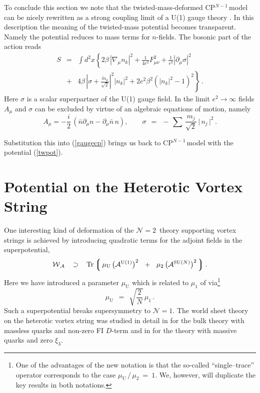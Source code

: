 \documentclass[12pt]{article}
\def\beq{\begin{equation}}
\def\eeq{\end{equation}}
\def\beqn{\begin{eqnarray}}
\def\eeqn{\end{eqnarray}}
\def\beqn{\begin{eqnarray}}
\def\eeqn{\end{eqnarray}}
\newcommand{\ntwon}{${\mathcal N}=2$}
\newcommand{\nonen}{${\mathcal N}=1$}
\newcommand{\pt}{\partial}
\newcommand{\mc}[1]{\mathcal{#1}}
\newcommand{\mw}{\mathcal{W}}
\newcommand{\ma}{\mathcal{A}}
\newcommand{\lgr}{\left\lgroup}
\newcommand{\rgr}{\right\rgroup}
\newcommand{\AU}{\mc{A}^{\rm U(1)}}
\newcommand{\AN}{\mc{A}^\text{SU($N$)}}
\newcommand{\muU}{\mu_\text{U}}
\newcommand{\cpn}{CP$^{N-1}$\,}
\newcommand{\Tr}{\text{Tr}}
\begin{document}
To conclude this section we note that the twisted-mass-deformed \cpn model can be nicely rewritten as a
strong coupling limit of a U(1) gauge theory \cite{HaHo}. 
In this description the meaning of the twisted-mass potential becomes  transparent. Namely the potential  reduces to mass terms for $n$-fields.  The bosonic part of the action reads
\beqn
S 
&=&
\int d^2 x \left\{
 2\beta\,|\nabla_{\mu} n_{k}|^2 +\frac1{4e^2}F^2_{\mu\nu} + \frac1{e^2}|\pt_{\mu}\sigma|^2
\right.
\nonumber\\[3mm]
 &+& \left. 4\beta\,|\sigma+\frac{\tilde{m}_{k}}{\sqrt{2}}|^2 |n_{k}|^2 +
 2e^2 \beta^2(|n_{k}|^2 -1)^2
\right\}\,.
\label{gaugecp}
\eeqn
Here $\sigma$ is a scalar superpartner of the U(1) gauge field.
In the limit $e^2\to \infty$ fields $A_{\mu}$ and $\sigma$  can be excluded by virtue of an algebraic
equations of motion, namely
\beq
A_{\mu}=-\frac{i}{2}\,\left(\bar{n}\pt_{\mu}n -\pt_{\mu}\bar{n}\,n
\right),
\qquad 
	\sigma    ~~=~~    -\, \sum\, \frac{m_j}{\sqrt{2}}\, \big|\, n_j \,\big|^2\,.
\label{Asigma}
\eeq


 Substitution this into (\ref{gaugecp}) brings us back to  \cpn model with the potential (\ref{twpot}).



\section{Potential on the Heterotic Vortex String}

	One interesting kind of deformation of the \ntwon\, theory supporting vortex strings is
	achieved by introducing quadratic terms for the adjoint fields in the superpotential,
\beq
\label{WA}
	\mw{}_\ma    ~~\:\supset\:~~    \Tr \lgr\, \muU\, \big( \AU \big)^2   ~~+~~  \mu_2\, \big( \AN \big)^2 \,\rgr.
\eeq
	Here we have introduced a parameter $ \muU $ which is related to $ \mu_1 $ of \cite{SY1} via\footnote{
		One of the advantages of the new notation is that the so-called ``single--trace'' operator
		corresponds to the case $ \muU \,/\, \mu_2  ~=~ 1 $.
		We, however, will duplicate the key results in both notations.}
\beq
	\muU    ~~=~~ \sqrt{\frac{2}{N}}\, \mu_1\,.
\eeq
	Such a superpotential breaks supersymmetry to \nonen. 
	The world sheet theory on the heterotic vortex string was studied in detail in \cite{Edalati,SY1,BSY3} for the bulk theory with massless quarks and non-zero FI $D$-term
	 and in \cite{Shifman:2010kr} for the 
	 theory with massive quarks and zero
	 $\xi_3$.
\end{document}
